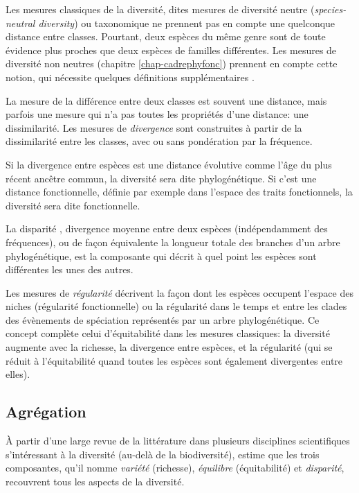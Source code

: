 \documentclass[
  11pt,
  french,
  a4paper,
  extrafontsizes,onecolumn,openright
  ]{memoir}
\newlength{\rf}
\begin{document}
Les mesures classiques de la diversité, dites mesures de diversité neutre (\emph{species-neutral diversity}) ou taxonomique ne prennent pas en compte une quelconque distance entre classes.
Pourtant, deux espèces du même genre sont de toute évidence plus proches que deux espèces de familles différentes.
Les mesures de diversité non neutres (chapitre \ref{chap-cadrephyfonc}) prennent en compte cette notion, qui nécessite quelques définitions supplémentaires \autocite{Mouillot2005,Ricotta2007}.

La mesure de la différence entre deux classes est souvent une distance, mais parfois une mesure qui n'a pas toutes les propriétés d'une distance: une dissimilarité.
Les mesures de \emph{divergence} \autocite{Pavoine2011} sont construites à partir de la dissimilarité entre les classes, avec ou sans pondération par la fréquence.

Si la divergence entre espèces est une distance évolutive comme l'âge du plus récent ancêtre commun, la diversité sera dite phylogénétique.
Si c'est une distance fonctionnelle, définie par exemple dans l'espace des traits fonctionnels, la diversité sera dite fonctionnelle.

La disparité \autocite{Runnegar1987}, divergence moyenne entre deux espèces (indépendamment des fréquences), ou de façon équivalente la longueur totale des branches d'un arbre phylogénétique, est la composante qui décrit à quel point les espèces sont différentes les unes des autres.

Les mesures de \emph{régularité} décrivent la façon dont les espèces occupent l'espace des niches (régularité fonctionnelle) ou la régularité dans le temps et entre les clades des évènements de spéciation représentés par un arbre phylogénétique.
Ce concept complète celui d'équitabilité dans les mesures classiques: la diversité augmente avec la richesse, la divergence entre espèces, et la régularité (qui se réduit à l'équitabilité quand toutes les espèces sont également divergentes entre elles).

\hypertarget{agruxe9gation}{%
\subsection{Agrégation}\label{agruxe9gation}}

À partir d'une large revue de la littérature dans plusieurs disciplines scientifiques s'intéressant à la diversité (au-delà de la biodiversité), \textcite{Stirling2007} estime que les trois composantes, qu'il nomme \emph{variété} (richesse), \emph{équilibre} (équitabilité) et \emph{disparité}, recouvrent tous les aspects de la diversité.
\end{document}
